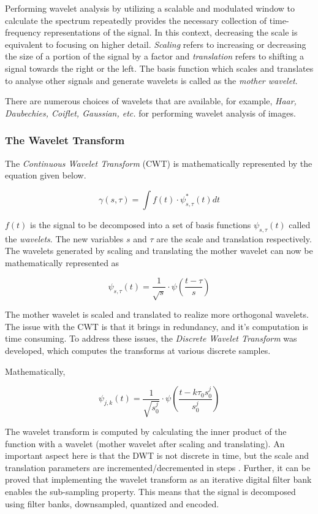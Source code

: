 \documentclass[./A14_Report.tex]{subfiles}
\begin{document}
\par

Performing wavelet analysis by utilizing a scalable and modulated window to
calculate the spectrum repeatedly provides the necessary collection of
time-frequency representations of the signal. In this context, decreasing the
scale is equivalent to focusing on higher detail. \textit{Scaling} refers to
increasing or decreasing the size of a portion of the signal by a factor and
\textit{translation} refers to shifting a signal towards the right or the left.
The basis function which scales and translates to analyse other signals and
generate wavelets is called as the \textit{mother wavelet}.

\par

There are numerous choices of wavelets that are available, for example,
\textit{Haar, Daubechies, Coiflet, Gaussian, etc.} for performing wavelet
analysis of images.

\subsubsection{The Wavelet Transform}%
\label{sec:the_wavelet_transform}

The \textit{Continuous Wavelet Transform} (CWT) is mathematically represented
by the equation given below.

\[\gamma(s, \tau) = \int f(t)\cdot\psi^{*}_{s, \tau}(t)dt\]

\(f(t)\) is the signal to be decomposed into a set of basis functions
\(\psi_{s,\tau}(t)\) called the \textit{wavelets}. The new variables \(s\) and
$\tau$ are the scale and translation respectively. The wavelets generated by
scaling and translating the mother wavelet can now be mathematically
represented as

$$\psi_{s,\tau}(t)=\frac{1}{\sqrt{s}}\cdot\psi \left (\frac{t-\tau}{s} \right)$$

The mother wavelet is scaled and translated to realize more orthogonal
wavelets. The issue with the CWT is that it brings in redundancy, and it's
computation is time consuming.  To address these issues, the \textit{Discrete
Wavelet Transform} was developed, which computes the transforms at various
discrete samples.

Mathematically,

$$\psi_{j,k}(t) = \frac{1}{\sqrt{s_{0}^j}} \cdot \psi \left (\frac{t - k \tau_{0}s_{0}^j}{s_{0}^j} \right )$$

The wavelet transform is computed by calculating the inner product of the
function with a wavelet (mother wavelet after scaling and translating).  An
important aspect here is that the DWT is not discrete in time, but the scale
and translation parameters are incremented/decremented in steps
\cite{valwav1999}.  Further, it can be proved that implementing the wavelet
transform as an iterative digital filter bank enables the sub-sampling property.
This means that the signal is decomposed using filter banks, downsampled,
quantized and encoded.
\end{document}
